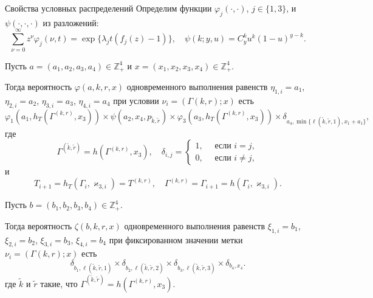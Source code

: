 \documentclass[10pt]{beamer}
\begin{document}
\begin{frame}[allowframebreaks]{Свойства условных распределений}
Определим функции $\varphi_j(\cdot,\cdot)$, $j\in \{1,3\}$, и $\psi(\cdot, \cdot, \cdot)$ из разложений:
\begin{equation*}
\sum_{\nu=0}^{\infty} z^\nu\varphi_j(\nu,t) = \exp\{\lambda_j t (f_j(z)-1)\}, \quad \psi(k;y,u)=C_y^k u^k (1-u)^{y-k}.	
\end{equation*}

Пусть $a=(a_1, a_2, a_3, a_4) \in \mathbb{Z}_+^4$ и $x=(x_1, x_2, x_3, x_4) \in \mathbb{Z}_+^4$.

Тогда вероятность $\varphi(a,k,r,x)$ одновременного выполнения равенств $\eta_{1,i}=a_1$, $\eta_{2,i}=a_2$, $\eta_{3,i}=a_3$, $\eta_{4,i}=a_4$ при условии  $\nu_i=(\Gamma{(k,r)}; x)$ есть 
\begin{equation}
\!\!\varphi_1(a_1,h_T(\Gamma^{({k},{r})},x_3)) \times \psi(a_2,x_4, p_{\tilde{k},\tilde{r}}) \times \varphi_3(a_3,h_T(\Gamma^{({k},{r})},x_3))
\times \delta_{a_4,\min{\{\ell(\tilde{k},\tilde{r},1), x_1+a_1}\}},
\end{equation}
где
\begin{equation*}
\Gamma^{(\tilde{k},\tilde{r})}=h(\Gamma^{(k,r)},x_3), \quad \delta_{i,j}=\begin{cases} 1, \quad \text{ если }i=j,\\0, \quad \text{ если } i\neq j,
\end{cases}
\end{equation*}
и 
$$
T_{i+1}=h_T(\Gamma_i,\varkappa_{3,i})= T^{(k,r)},\quad  \Gamma^{(k,r)}=\Gamma_{i+1}=h(\Gamma_i,\varkappa_{3,i}).
$$
\framebreak

Пусть $b=(b_1, b_2, b_3, b_4) \in \mathbb{Z}_+^4$. 

Тогда вероятность $\zeta(b, k, r, x)$ одновременного выполнения равенств $\xi_{1,i}=b_1$, $\xi_{2,i}=b_2$, $\xi_{3,i}=b_3$, $\xi_{4,i}=b_4$ при фиксированном значении метки $\nu_i=(\Gamma{(k,r)}; x)$ есть
\begin{equation}
\delta_{b_1,\ell(\tilde{k},\tilde{r},1)} \times \delta_{b_2,\ell(\tilde{k},\tilde{r},2)} \times 
\delta_{b_3,\ell(\tilde{k},\tilde{r},3)} \times \delta_{b_4,x_4}.
\end{equation}
где $\tilde{k}$ и $\tilde{r}$ такие, что $\Gamma^{(\tilde{k},\tilde{r})}=h(\Gamma^{(k,r)},x_3)$.
\end{frame}
\end{document}
